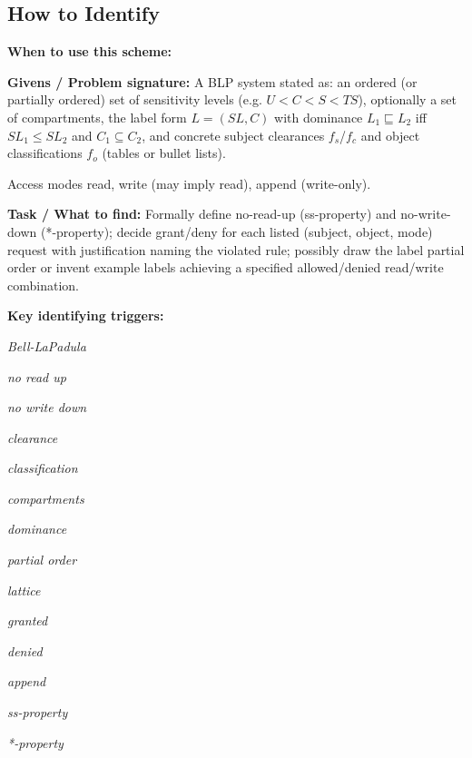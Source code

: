 \documentclass[12pt, a4paper]{article}
\begin{document}
\subsection*{How to Identify}

\textbf{When to use this scheme:}

\textbf{Givens / Problem signature:}
A BLP system stated as: an ordered (or partially ordered) set of sensitivity levels (e.g. $U < C < S < TS$), optionally a set of compartments, the label form $L = (SL, C)$ with dominance $L_1 \sqsubseteq L_2$ iff $SL_1 \leq SL_2$ and $C_1 \subseteq C_2$, and concrete subject clearances $f_s$/$f_c$ and object classifications $f_o$ (tables or bullet lists).

Access modes read, write (may imply read), append (write-only).

\textbf{Task / What to find:}
Formally define no-read-up (ss-property) and no-write-down (*-property); decide grant/deny for each listed (subject, object, mode) request with justification naming the violated rule; possibly draw the label partial order or invent example labels achieving a specified allowed/denied read/write combination.

\textbf{Key identifying triggers:}
\begin{tightitem}
        \item \textit{Bell-LaPadula}
        \item \textit{no read up}
        \item \textit{no write down}
        \item \textit{clearance}
        \item \textit{classification}
        \item \textit{compartments}
        \item \textit{dominance}
        \item \textit{partial order}
        \item \textit{lattice}
        \item \textit{granted}
        \item \textit{denied}
        \item \textit{append}
        \item \textit{ss-property}
        \item \textit{*-property}
    \end{tightitem}
\end{document}
